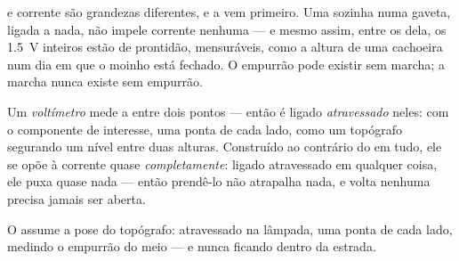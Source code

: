 \begin{proposition}\label{prop:g8:voltage-voltmeter:nocurrent}
 e corrente são grandezas diferentes, e a  vem primeiro.
Uma  sozinha numa gaveta, ligada a nada, não impele corrente
nenhuma --- e mesmo assim, entre os  dela, os \qty{1.5}{V}
inteiros estão de prontidão, mensuráveis, como a altura de uma
cachoeira num dia em que o moinho está fechado. O empurrão pode
existir sem marcha; a marcha nunca existe sem empurrão.
\end{proposition}

\begin{definition}[Voltímetro]\label{def:g8:voltage-voltmeter:voltmeter}
Um \emph{voltímetro} mede a  entre dois
pontos --- então é ligado \emph{atravessado} neles: \emph{} com o componente de interesse, uma ponta de cada lado, como
um topógrafo segurando um nível entre duas alturas. Construído ao
contrário do  em tudo, ele se opõe à corrente quase
\emph{completamente}: ligado atravessado em qualquer coisa, ele puxa
quase nada --- então prendê-lo não atrapalha nada, e volta nenhuma
precisa jamais ser aberta.
\end{definition}

\begin{omfigure}

{\small O  assume a pose do topógrafo: atravessado na
lâmpada, uma ponta de cada lado, medindo o empurrão do meio --- e
nunca ficando dentro da estrada.}
\end{omfigure}

